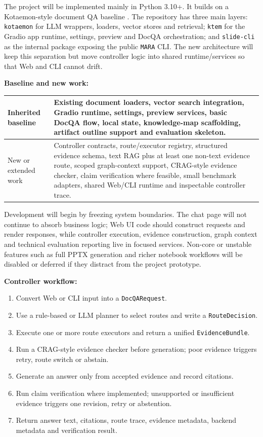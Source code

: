 \documentclass[a4paper,11pt]{article}
\begin{document}
The project will be implemented mainly in Python 3.10+. It builds on a Kotaemon-style document QA baseline \cite{kotaemon}. The repository has three main layers: \texttt{kotaemon} for LLM wrappers, loaders, vector stores and retrieval; \texttt{ktem} for the Gradio app runtime, settings, preview and DocQA orchestration; and \texttt{slide-cli} as the internal package exposing the public \texttt{MARA} CLI. The new architecture will keep this separation but move controller logic into shared runtime/services so that Web and CLI cannot drift.

\textbf{Baseline and new work:}
\begin{center}
\scriptsize
\begin{tabularx}{\textwidth}{p{}X}
\toprule
Inherited baseline & Existing document loaders, vector search integration, Gradio runtime, settings, preview services, basic DocQA flow, local state, knowledge-map scaffolding, artifact outline support and evaluation skeleton. \\
\midrule
New or extended work & Controller contracts, route/executor registry, structured evidence schema, text RAG plus at least one non-text evidence route, scoped graph-context support, CRAG-style evidence checker, claim verification where feasible, small benchmark adapters, shared Web/CLI runtime and inspectable controller trace. \\
\bottomrule
\end{tabularx}
\end{center}

Development will begin by freezing system boundaries. The chat page will not continue to absorb business logic; Web UI code should construct requests and render responses, while controller execution, evidence construction, graph context and technical evaluation reporting live in focused services. Non-core or unstable features such as full PPTX generation and richer notebook workflows will be disabled or deferred if they distract from the project prototype.

\textbf{Controller workflow:}
\begin{enumerate}
  \item Convert Web or CLI input into a \texttt{DocQARequest}.
  \item Use a rule-based or LLM planner to select routes and write a \texttt{RouteDecision}.
  \item Execute one or more route executors and return a unified \texttt{EvidenceBundle}.
  \item Run a CRAG-style evidence checker before generation; poor evidence triggers retry, route switch or abstain.
  \item Generate an answer only from accepted evidence and record citations.
  \item Run claim verification where implemented; unsupported or insufficient evidence triggers one revision, retry or abstention.
  \item Return answer text, citations, route trace, evidence metadata, backend metadata and verification result.
\end{enumerate}
\end{document}
